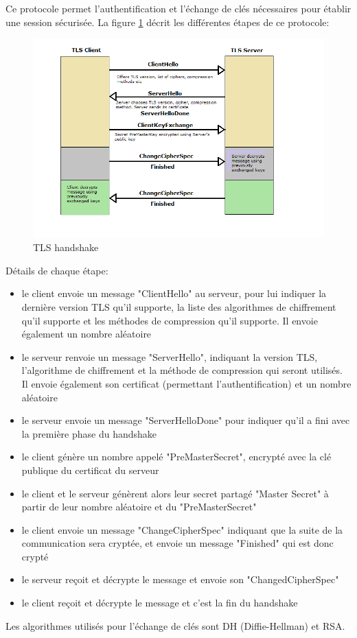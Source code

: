 Ce protocole permet l'authentification et l'échange de clés nécessaires pour établir une session sécurisée. La figure \ref{handshake} décrit les différentes étapes de ce protocole:
\begin{figure}[H]
  \centering
  \includegraphics[scale=0.6]{img/tls-handshake.png}
  \caption{TLS handshake}
  \label{handshake}
\end{figure}  

Détails de chaque étape:
\begin{itemize}
\item le client envoie un message "ClientHello" au serveur, pour lui indiquer la dernière version TLS qu'il supporte, la liste des algorithmes de chiffrement qu'il supporte et les méthodes de compression qu'il supporte. Il envoie également un nombre aléatoire
\item le serveur renvoie un message "ServerHello", indiquant la version TLS, l'algorithme de chiffrement et la méthode de compression qui seront utilisés. Il envoie également son certificat (permettant l'authentification) et un nombre aléatoire
\item le serveur envoie un message "ServerHelloDone" pour indiquer qu'il a fini avec la première phase du handshake
\item le client génère un nombre appelé "PreMasterSecret", encrypté avec la clé publique du certificat du serveur
\item le client et le serveur génèrent alors leur secret partagé "Master Secret" à partir de leur nombre aléatoire et du "PreMasterSecret"
\item le client envoie un message "ChangeCipherSpec" indiquant que la suite de la communication sera cryptée, et envoie un message "Finished" qui est donc crypté
\item le serveur reçoit et décrypte le message et envoie son "ChangedCipherSpec"
\item le client reçoit et décrypte le message et c'est la fin du handshake
\end{itemize}
Les algorithmes utilisés pour l'échange de clés sont DH (Diffie-Hellman) et RSA.

